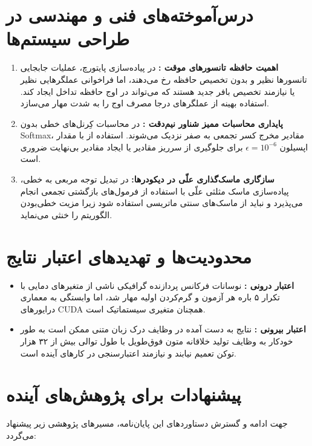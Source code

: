 \documentclass[12pt,a4paper]{report}
\theoremstyle{definition}
\begin{document}
\section{درس‌آموخته‌های فنی و مهندسی در طراحی سیستم‌ها}
\begin{enumerate}
    \item \textbf{اهمیت حافظه تانسورهای موقت :} در پیاده‌سازی پایتورچ، عملیات جابجایی تانسورها نظیر  و  بدون تخصیص حافظه رخ می‌دهند، اما فراخوانی عملگرهایی نظیر  یا  نیازمند تخصیص بافر جدید هستند که می‌تواند در اوج حافظه تداخل ایجاد کند. استفاده بهینه از عملگرهای درجا  مصرف اوج را به شدت مهار می‌سازد.
    \item \textbf{پایداری محاسبات ممیز شناور نیم‌دقت :} در محاسبات کِرنل‌های خطی بدون Softmax، مقادیر مخرج کسر تجمعی به صفر نزدیک می‌شوند. استفاده از  با مقدار اپسیلون $\epsilon = 10^{-6}$ برای جلوگیری از سرریز مقادیر یا ایجاد مقادیر بی‌نهایت ضروری است.
    \item \textbf{سازگاری ماسک‌گذاری علّی در دیکودرها:} در تبدیل توجه مربعی به خطی، پیاده‌سازی ماسک مثلثی علّی با استفاده از فرمول‌های بازگشتی تجمعی  انجام می‌پذیرد و نباید از ماسک‌های سنتی ماتریسی استفاده شود زیرا مزیت خطی‌بودن الگوریتم را خنثی می‌نماید.
\end{enumerate}

\section{محدودیت‌ها و تهدیدهای اعتبار نتایج }
\begin{itemize}
    \item \textbf{اعتبار درونی :} نوسانات فرکانس پردازنده گرافیکی ناشی از متغیرهای دمایی با تکرار ۵ باره هر آزمون و گرم‌کردن اولیه  مهار شد، اما وابستگی به معماری درایورهای CUDA همچنان متغیری سیستماتیک است.
    \item \textbf{اعتبار بیرونی :} نتایج به دست آمده در وظایف درک زبان متنی  ممکن است به طور خودکار به وظایف تولید خلاقانه متون فوق‌طویل  با طول توالی بیش از ۳۲ هزار توکن تعمیم نیابند و نیازمند اعتبارسنجی در کارهای آینده است.
\end{itemize}

\section{پیشنهادات برای پژوهش‌های آینده}
جهت ادامه و گسترش دستاوردهای این پایان‌نامه، مسیرهای پژوهشی زیر پیشنهاد می‌گردد:
\end{document}
